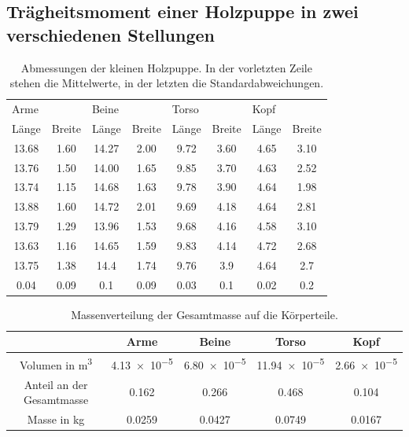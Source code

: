 \subsection{Trägheitsmoment einer Holzpuppe in zwei verschiedenen Stellungen}

\begin{table}
  \centering
  \begin{tabular}{c c c c c c c c}
    \toprule
    \multicolumn{2}{l}{Arme} & \multicolumn{2}{l}{Beine} & \multicolumn{2}{l}{Torso}
    & \multicolumn{2}{l}{Kopf} \\
    Länge & Breite & Länge & Breite & Länge & Breite & Länge & Breite \\
    \midrule
    13.68 & 1.60 & 14.27 & 2.00 & 9.72 & 3.60 & 4.65 & 3.10 \\
    13.76 & 1.50 & 14.00 & 1.65 & 9.85 & 3.70 & 4.63 & 2.52 \\
    13.74 & 1.15 & 14.68 & 1.63 & 9.78 & 3.90 & 4.64 & 1.98 \\
    13.88 & 1.60 & 14.72 & 2.01 & 9.69 & 4.18 & 4.64 & 2.81 \\
    13.79 & 1.29 & 13.96 & 1.53 & 9.68 & 4.16 & 4.58 & 3.10 \\
    13.63 & 1.16 & 14.65 & 1.59 & 9.83 & 4.14 & 4.72 & 2.68 \\
    \midrule
    13.75 & 1.38 & 14.4 & 1.74 & 9.76 & 3.9 & 4.64 & 2.7 \\
    0.04  & 0.09 & 0.1  & 0.09 & 0.03 & 0.1 & 0.02 & 0.2 \\
    \bottomrule
  \end{tabular}
  \caption{Abmessungen der kleinen Holzpuppe. In der vorletzten Zeile stehen die
  Mittelwerte, in der letzten die Standardabweichungen.}
  \label{tab:abmessungen_puppe}
\end{table}

\begin{table}
  \centering
  \begin{tabular}{c| c c c c}
    \toprule
     & Arme & Beine & Torso & Kopf \\
    \midrule
    Volumen in \si{\cubic\meter} & \num{4.13e-5} & \num{6.80e-5} & \num{11.94e-5}
    & \num{2.66e-5} \\
    Anteil an der Gesamtmasse & 0.162 & 0.266 & 0.468 & 0.104 \\
    Masse in \si{\kilo\gram} & 0.0259 & 0.0427 & 0.0749 & 0.0167 \\
    \bottomrule
  \end{tabular}
  \caption{Massenverteilung der Gesamtmasse auf die Körperteile.}
  \label{tab:massenverteilung}
\end{table}

